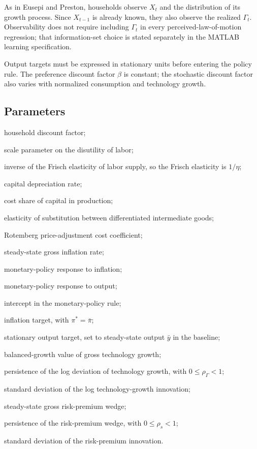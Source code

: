 \documentclass[12pt,final]{article}
\begin{document}
As in Eusepi and Preston, households observe $X_t$ and the distribution of its
growth process.  Since $X_{t-1}$ is already known, they also observe the realized
$\Gamma_t$.  Observability does not require including $\Gamma_t$ in every
perceived-law-of-motion regression; that information-set choice is stated
separately in the MATLAB learning specification.

Output targets must be expressed in stationary units before entering the policy
rule.  The preference discount factor $\beta$ is constant; the stochastic
discount factor also varies with normalized consumption and technology growth.

\subsection{Parameters}

\begin{description}[style=multiline,leftmargin=3.2cm,font=\normalfont]
  \item[$\beta$] household discount factor;
  \item[$\chi$] scale parameter on the disutility of labor;
  \item[$\eta$] inverse of the Frisch elasticity of labor supply, so the Frisch elasticity is $1/\eta$;
  \item[$\delta$] capital depreciation rate;
  \item[$\alpha$] cost share of capital in production;
  \item[$\theta$] elasticity of substitution between differentiated intermediate goods;
  \item[$\varphi$] Rotemberg price-adjustment cost coefficient;
  \item[$\bar{\pi}$] steady-state gross inflation rate;
  \item[$\phi_{\pi}$] monetary-policy response to inflation;
  \item[$\phi_y$] monetary-policy response to output;
  \item[$r^*$] intercept in the monetary-policy rule;
  \item[$\pi^*$] inflation target, with $\pi^*=\bar{\pi}$;
  \item[$y_t^*$] stationary output target, set to steady-state output $\bar y$
        in the baseline;
  \item[$\bar\Gamma$] balanced-growth value of gross technology growth;
  \item[$\rho_\Gamma$] persistence of the log deviation of technology growth,
        with $0\leq\rho_\Gamma<1$;
  \item[$\sigma_\Gamma$] standard deviation of the log technology-growth
        innovation;
  \item[$\bar s$] steady-state gross risk-premium wedge;
  \item[$\rho_s$] persistence of the risk-premium wedge, with
        $0\leq\rho_s<1$;
  \item[$\sigma_s$] standard deviation of the risk-premium innovation.
\end{description}
\end{document}
